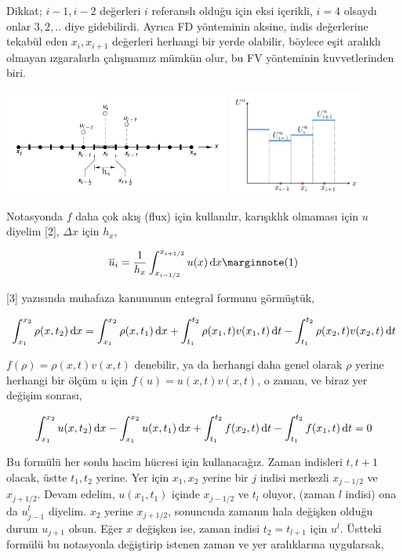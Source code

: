 \documentclass[12pt,fleqn]{article}\usepackage{../../common}
\begin{document}
Dikkat; $i-1,i-2$ değerleri $i$ referanslı olduğu için eksi içerikli, $i=4$
olsaydı onlar $3,2,..$ diye gidebilirdi. Ayrıca FD yönteminin aksine, indis
değerlerine tekabül eden $x_i,x_{i+1}$ değerleri herhangi bir yerde olabilir,
böylece eşit aralıklı olmayan ızgaralarla çalışmamız mümkün olur, bu FV
yönteminin kuvvetlerinden biri.

\includegraphics[width=20em]{12-20-00.png}
\includegraphics[width=12em]{12-19-02.png}

Notasyonda $f$ daha çok akış (flux) için kullanılır, karışıklık olmaması
için $u$ diyelim [2], $\Delta x$ için $h_x$,

$$
\overline{u}_i =  \frac{1}{h_x} \int_{x_{i-1/2}}^{x_{i+1/2}} u(x) \ud x
\mlabel{1}
$$

[3] yazısında muhafaza kanununun entegral formunu görmüştük,

$$
\int _{x_1}^{x_2} \rho(x,t_2) \,\mathrm{d} x =
\int _{x_1}^{x_2} \rho(x,t_1) \,\mathrm{d} x  +
\int_{t_1}^{t_2} \rho(x_1,t) v(x_1,t) \,\mathrm{d} t -
\int_{t_1}^{t_2}  \rho(x_2,t) v(x_2,t) \,\mathrm{d} t
$$

$f(\rho) = \rho(x,t) v(x,t)$ denebilir, ya da herhangi daha genel olarak $\rho$
yerine herhangi bir ölçüm $u$ için $f(u) = u(x,t) v(x,t)$, o zaman, ve
biraz yer değişim sonrası,

$$
\int_{x_1}^{x_2} u(x,t_2) \,\mathrm{d} x -
\int_{x_1}^{x_2} u(x,t_1) \,\mathrm{d} x  +
\int_{t_1}^{t_2} f(x_2,t) \,\mathrm{d} t  -
\int_{t_1}^{t_2} f(x_1,t) \,\mathrm{d} t = 0
$$

Bu formülü her sonlu hacim hücresi için kullanacağız. Zaman indisleri $t,t+1$
olacak, üstte $t_1,t_2$ yerine. Yer için $x_1,x_2$ yerine bir $j$ indisi
merkezli $x_{j-1/2}$ ve $x_{j+1/2}$. Devam edelim, $u(x_1,t_1)$ içinde
$x_{j-1/2}$ ve $t_l$ oluyor, (zaman $l$ indisi) ona da $u_{j-1}^l$
diyelim. $x_2$ yerine $x_{j+1/2}$, sonuncuda zamanın hala değişken olduğu durum
$u_{j+1}$ olsun. Eğer $x$ değişken ise, zaman indisi $t_2 = t_{l+1}$ için
$u^{l}$. Üstteki formülü bu notasyonla değiştirip istenen zaman ve yer
aralıklarına uygularsak,
\end{document}

